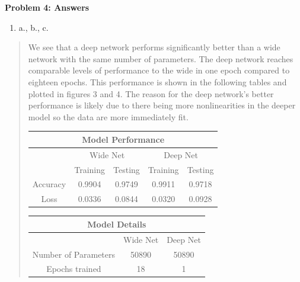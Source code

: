 {\bf Problem 4: Answers}

\begin{enumerate}
    \item[] a., b., c.
\end{enumerate}

\begin{quote}
    We see that a deep network performs significantly better than a wide network with the same number of parameters.
    The deep network reaches comparable levels of performance to the wide in one epoch compared to eighteen epochs. 
    This performance is shown in the following tables and plotted in figures 3 and 4.
    The reason for the deep network's better performance is likely due to there being more nonlinearities in the deeper model so the data are more immediately fit.

    \begin{center}
	\begin{tabular}{ |c|c|c|c|c| } 
	    \multicolumn{5}{c}{Model Performance} \\	
	    \hline
	    & \multicolumn{2}{c|}{Wide Net} & \multicolumn{2}{c|}{Deep Net} \\
	    \hline
	    & Training & Testing & Training & Testing \\
	    \hline
	    Accuracy & 0.9904 & 0.9749 & 0.9911 & 0.9718 \\ 
	    \hline
	    Loss & 0.0336 & 0.0844 & 0.0320 & 0.0928 \\ 
	    \hline
	\end{tabular}
	\begin{tabular}{ |c|c|c|c|c| } 
	    \multicolumn{5}{c}{Model Details} \\
	    \hline	
	    & \multicolumn{2}{c|}{Wide Net} & \multicolumn{2}{c|}{Deep Net} \\
	    \hline
	    Number of Parameters & \multicolumn{2}{c|}{50890} & \multicolumn{2}{c|}{50890} \\
	    \hline
	    Epochs trained & \multicolumn{2}{c|}{18} & \multicolumn{2}{c|}{1} \\
	    \hline
	\end{tabular}
    \end{center}


\end{quote}
